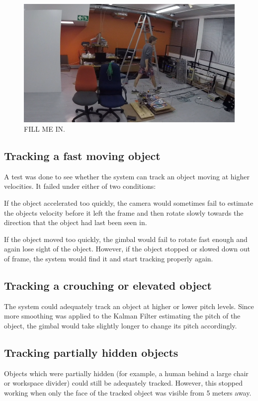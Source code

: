 \begin{figure}[h!]
  \centering
  \includegraphics[width=\textwidth]{results/follow_walk_small_delay}
  \caption{\label{fig:follow_walk_small_delay} FILL ME IN.}
\end{figure}

\subsection{Tracking a fast moving object}
A test was done to see whether the system can track an object moving at higher velocities. It failed under either of two conditions:

If the object accelerated too quickly, the camera would sometimes fail to estimate the objects velocity before it left the frame and then rotate slowly towards the direction that the object had last been seen in.

If the object moved too quickly, the gimbal would fail to rotate fast enough and again lose sight of the object. However, if the object stopped or slowed down out of frame, the system would find it and start tracking properly again.


\subsection{Tracking a crouching or elevated object}
The system could adequately track an object at higher or lower pitch levels. Since more smoothing was applied to the Kalman Filter estimating the pitch of the object, the gimbal would take slightly longer to change its pitch accordingly.


\subsection{Tracking partially hidden objects}
Objects which were partially hidden (for example, a human behind a large chair or workspace divider) could still be adequately tracked. However, this stopped working when only the face of the tracked object was visible from 5 meters away.


